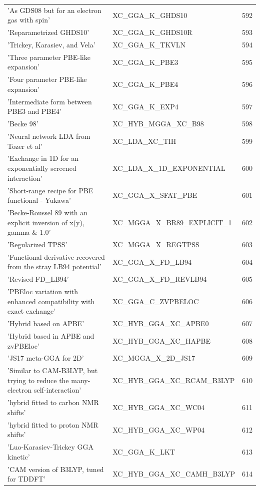 \documentclass[final,12pt,makeidx,DIV=calc]{article}
\begin{document}
{{{\begin{table}[!h]
\begin{center}
\begin{tabular}{llr}
  'As GDS08 but for an electron gas with spin' & XC\_GGA\_K\_GHDS10  &592\\
  'Reparametrized GHDS10' & XC\_GGA\_K\_GHDS10R  &593\\
  'Trickey, Karasiev, and Vela' & XC\_GGA\_K\_TKVLN  &594\\
  'Three parameter PBE-like expansion' & XC\_GGA\_K\_PBE3  &595\\
  'Four parameter PBE-like expansion' & XC\_GGA\_K\_PBE4  &596\\
  'Intermediate form between PBE3 and PBE4' & XC\_GGA\_K\_EXP4  &597\\
  'Becke 98' & XC\_HYB\_MGGA\_XC\_B98  &598\\
  'Neural network LDA from Tozer et al' & XC\_LDA\_XC\_TIH  &599\\
  'Exchange in 1D for an exponentially screened interaction' & XC\_LDA\_X\_1D\_EXPONENTIAL  &600\\
  'Short-range recipe for PBE functional - Yukawa' & XC\_GGA\_X\_SFAT\_PBE  &601\\
  'Becke-Roussel 89 with an explicit inversion of x(y), gamma \& 1.0' & XC\_MGGA\_X\_BR89\_EXPLICIT\_1  &602\\
  'Regularized TPSS' & XC\_MGGA\_X\_REGTPSS  &603\\
  'Functional derivative recovered from the stray LB94 potential' & XC\_GGA\_X\_FD\_LB94  &604\\
  'Revised FD\_LB94' & XC\_GGA\_X\_FD\_REVLB94  &605\\
  'PBEloc variation with enhanced compatibility with exact exchange' & XC\_GGA\_C\_ZVPBELOC  &606\\
  'Hybrid based on APBE' & XC\_HYB\_GGA\_XC\_APBE0  &607\\
  'Hybrid based in APBE and zvPBEloc' & XC\_HYB\_GGA\_XC\_HAPBE  &608\\
  'JS17 meta-GGA for 2D' & XC\_MGGA\_X\_2D\_JS17  &609\\
  'Similar to CAM-B3LYP, but trying to reduce the many-electron self-interaction' & XC\_HYB\_GGA\_XC\_RCAM\_B3LYP  &610\\
  'hybrid fitted to carbon NMR shifts' & XC\_HYB\_GGA\_XC\_WC04  &611\\
  'hybrid fitted to proton NMR shifts' & XC\_HYB\_GGA\_XC\_WP04  &612\\
  'Luo-Karasiev-Trickey GGA kinetic' & XC\_GGA\_K\_LKT  &613\\
  'CAM version of B3LYP, tuned for TDDFT' & XC\_HYB\_GGA\_XC\_CAMH\_B3LYP  &614\\

\end{tabular}
\end{center}
\end{table}}}}
\end{document}
